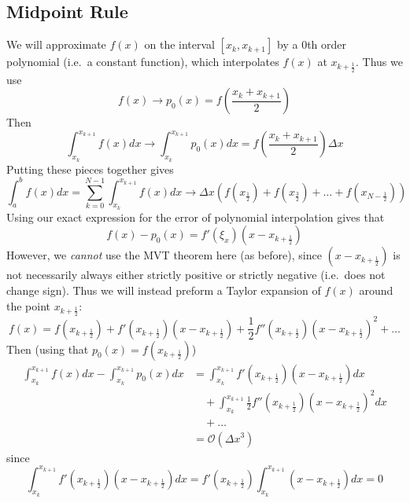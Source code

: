 \documentclass[12pt]{article}
\theoremstyle{definition}
\theoremstyle{definition}
\begin{document}
\subsection{Midpoint Rule}
We will approximate $f(x)$ on the interval $[x_k,x_{k+1}]$ by a $0$th order polynomial (i.e.\ a constant function), which interpolates $f(x)$ at $x_{k + \frac{1}{2}}$. Thus we use
\begin{equation}
	f(x) \to p_0(x) = f\left(\frac{x_k + x_{k+1}}{2}\right)
\end{equation}
Then
\begin{equation}
	\int_{x_k}^{x_{k+1}} f(x) dx \to \int_{x_k}^{x_{k+1}} p_0(x)dx = f\left(\frac{x_k + x_{k+1}}{2}\right) \Delta x
\end{equation}
Putting these pieces together gives
\begin{equation}
	\int_a^b f(x)dx = \sum_{k=0}^{N-1} \int_{x_k}^{x_{k+1}} f(x)dx \to \Delta x \left( f(x_{\frac{1}{2}}) + f(x_{\frac{3}{2}}) + \ldots + f(x_{N - \frac{1}{2}})\right)
\end{equation}
Using our exact expression for the error of polynomial interpolation gives that
\begin{equation}
	f(x) - p_0(x) = f'(\xi_x)(x - x_{k + \frac{1}{2}})
\end{equation}
However, we \emph{cannot} use the MVT theorem here (as before), since $(x - x_{k + \frac{1}{2}})$ is not necessarily always either strictly positive or strictly negative (i.e.\ does not change sign). Thus we will instead preform a Taylor expansion of $f(x)$ around the point $x_{k + \frac{1}{2}}$:
\begin{equation}
	f(x) = f(x_{k + \frac{1}{2}}) + f'(x_{k + \frac{1}{2}})(x - x_{k + \frac{1}{2}}) + \frac{1}{2}f''(x_{k + \frac{1}{2}})(x - x_{k + \frac{1}{2}})^2 + \ldots
\end{equation}
Then (using that $p_0(x) = f(x_{k + \frac{1}{2}})$)
\begin{align*}
	\int_{x_k}^{x_{k+1}}f(x)dx - \int_{x_k}^{x_{k+1}}p_0(x)dx &=
	\int_{x_k}^{x_{k+1}} f'(x_{k + \frac{1}{2}})(x - x_{k + \frac{1}{2}}) dx \\
	&\quad + \int_{x_k}^{x_{k+1}} \frac{1}{2}f''(x_{k + \frac{1}{2}})(x - x_{k + \frac{1}{2}})^2 dx \\
	&\quad + \ldots \\
	&= \mathcal{O}(\Delta x^3)
\end{align*}
since 
\begin{equation}
	\int_{x_k}^{x_{k+1}} f'(x_{k + \frac{1}{2}})(x - x_{k + \frac{1}{2}}) dx = f'(x_{k + \frac{1}{2}}) \int_{x_k}^{x_{k+1}} (x - x_{k + \frac{1}{2}}) dx=0
\end{equation}
\end{document}
